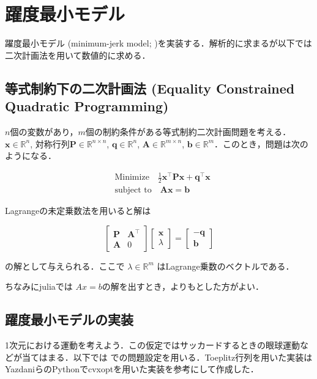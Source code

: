 \section{躍度最小モデル}
躍度最小モデル (minimum-jerk model; \citep{Flash1985-vj})を実装する．解析的に求まるが以下では二次計画法を用いて数値的に求める．

\subsection{等式制約下の二次計画法 (Equality Constrained Quadratic Programming)}

$n$個の変数があり，$m$個の制約条件がある等式制約二次計画問題を考える．$\mathbf {x}\in \mathbb{R}^n$, 対称行列$\mathbf{P}\in \mathbb{R}^{n\times n}$,  $\mathbf {q}\in \mathbb{R}^{n}$, $\mathbf{A}\in \mathbb{R}^{m\times n}$, $\mathbf {b}\in \mathbb{R}^m$．このとき，問題は次のようになる．


\begin{align}
&{\text{Minimize}}\quad {\frac {1}{2}}\mathbf {x}^\top \mathbf{P}\mathbf {x} +\mathbf {q} ^{\top}\mathbf {x}\\
&{\text{subject to}}\quad \mathbf{A}\mathbf {x} =\mathbf {b}
\end{align}


Lagrangeの未定乗数法を用いると解は


\begin{equation}
{\begin{bmatrix}\mathbf{P}&\mathbf{A}^\top\\\mathbf{A}&0\end{bmatrix}}{\begin{bmatrix}\mathbf {x} \\
\lambda \end{bmatrix}}={\begin{bmatrix}-\mathbf {q} \\\mathbf {b} \end{bmatrix}}
\end{equation}


の解として与えられる．ここで $\lambda \in \mathbb{R}^{m}$  はLagrange乗数のベクトルである．


ちなみにjuliaでは $Ax=b$の解を出すとき，よりもとした方がよい．

\subsection{躍度最小モデルの実装}
1次元における運動を考えよう．この仮定ではサッカードするときの眼球運動などが当てはまる．以下では \citep{Yazdani2012-sx} での問題設定を用いる．Toeplitz行列を用いた実装はYazdaniらのPythonでcvxoptを用いた実装を参考にして作成した．


